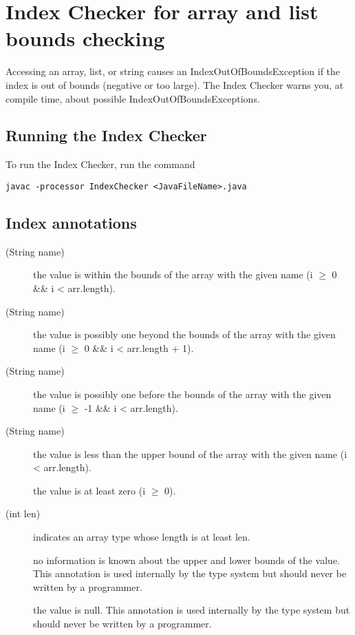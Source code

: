 \chapter{Index Checker for array and list bounds checking\label{index-checker}}

Accessing an array, list, or string causes an IndexOutOfBoundsException
if the index is out of bounds (negative or too large).
The Index Checker warns you, at compile time, about possible
IndexOutOfBoundsExceptions.


\section{Running the Index Checker\label{index-running}}

To run the Index Checker, run the command

\begin{Verbatim}
javac -processor IndexChecker <JavaFileName>.java
\end{Verbatim}


\section{Index annotations\label{index-annotations}}

\begin{description}
\item[(String name)]
	the value is within the bounds of the array with the given
	name (i $\ge$ 0 \&\& i < arr.length).
\item[(String name)]
	the value is possibly one beyond the bounds of the array with
	the given name (i $\ge$ 0 \&\& i < arr.length + 1).
\item[(String name)]
	the value is possibly one before the bounds of the array with the
	given name (i $\ge$ -1 \&\& i < arr.length).
\item[(String name)]
	the value is less than the upper bound of the array with the given
	name (i < arr.length).
\item[]
	the value is at least zero (i $\ge$ 0).
\item[(int len)]
	indicates an array type whose length is at least len.
\item[]
        no information is known about the upper and lower bounds of the value.
        This annotation is used internally by the type system but should never
        be written by a programmer.
\item[]
        the value is null.
        This annotation is used internally by the type system but should never
        be written by a programmer.
\end{description}

